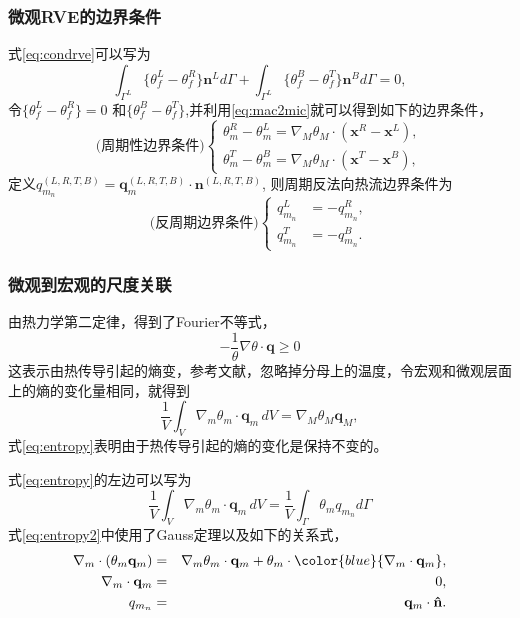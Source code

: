 \subsubsection{微观RVE的边界条件}
式\eqref{eq:condrve}可以写为
\begin{equation}
	\int_{\Gamma^L}\{\theta_f^L-\theta_f^R\}\mathbf{n}^Ld\Gamma + \int_{\Gamma^L}\{\theta_f^B-\theta_f^T\}\mathbf{n}^Bd\Gamma = 0,
\end{equation}
令$\{\theta_f^L-\theta_f^R\}=0$ 和$\{\theta_f^B-\theta_f^T\}$,并利用\eqref{eq:mac2mic}就可以得到如下的边界条件，
\begin{equation}
	\text{(周期性边界条件)}
	\begin{cases}
		\theta_m^R -\theta_m^L = \nabla_M \theta_M \cdot (\mathbf{x}^R - \mathbf{x}^L), \\
		\theta_m^T -\theta_m^B = \nabla_M \theta_M \cdot (\mathbf{x}^T - \mathbf{x}^B),
	\end{cases}
\end{equation}
定义$q_{m_n}^{(L,R,T,B)} = \mathbf{q}_m^{(L,R,T,B)} \cdot \mathbf{n}^{(L,R,T,B)}$,
则周期反法向热流边界条件为
\begin{equation}
	\text{(反周期边界条件)}
	\begin{cases}
		q_{m_n}^L &= - q_{m_n}^R, \\
		q_{m_n}^T &= - q_{m_n}^B.
	\end{cases}
\end{equation}
	

\subsubsection{微观到宏观的尺度关联}
由热力学第二定律，得到了Fourier不等式，
\begin{equation}
	-\frac{1}{\theta}\nabla\theta\cdot\mathbf{q}\geqslant 0
\end{equation}
这表示由热传导引起的熵变，参考文献\cite{ostoja2002towards}，忽略掉分母上的温度，令宏观和微观层面上的熵的变化量相同，就得到
\begin{equation}
	\frac{1}{V} \int_V \nabla_m \theta_m \cdot \mathbf{q}_m \, dV = \nabla_M\theta_M\mathbf{q}_M,
	\label{eq:entropy}
\end{equation}
式\eqref{eq:entropy}表明由于热传导引起的熵的变化是保持不变的。

式\eqref{eq:entropy}的左边可以写为
\begin{equation}
	\frac{1}{V} \int_V \nabla_m \theta_m \cdot \mathbf{q}_m \, dV = \frac{1}{V}\int_{\Gamma}\theta_m q_{m_n} d\Gamma
	\label{eq:entropy2}
\end{equation}
式\eqref{eq:entropy2}中使用了Gauss定理以及如下的关系式，
\begin{eqnarray*}
	\nabla_m \cdot (\theta_m\mathbf{q}_m) &=& \nabla_m\theta_m\cdot \mathbf{q}_m + \theta_m \cdot \color{blue}{\nabla_m \cdot \mathbf{q}_m} ,\\
	\nabla_m \cdot \mathbf{q}_m &=& 0 ,\\
	q_{m_n} &=& \mathbf{q}_m \cdot \mathbf{\hat{n}}.
\end{eqnarray*}

